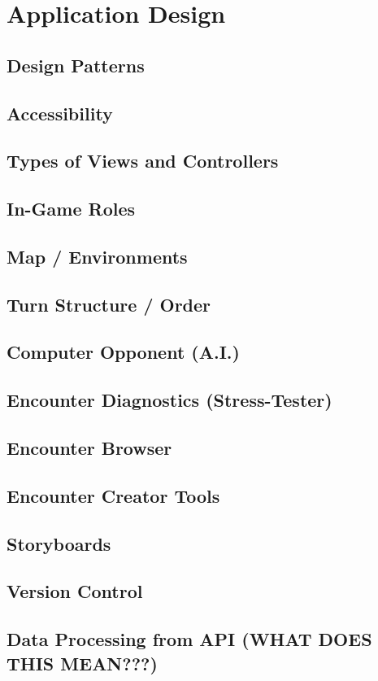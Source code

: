 \documentclass[12pt,a4paper]{report}
\begin{document}
\chapter*{Application Design}
	\section{Design Patterns}
	\section{Accessibility}
	\section{Types of Views and Controllers}
	\section{In-Game Roles}
	\section{Map / Environments}
	\section{Turn Structure / Order}
	\section{Computer Opponent (A.I.)}
	\section{Encounter Diagnostics (Stress-Tester)}
	\section{Encounter Browser}
	\section{Encounter Creator Tools}
	\section{Storyboards}
	\section{Version Control}
	\section{Data Processing from API (WHAT DOES THIS MEAN???)}
\end{document}
